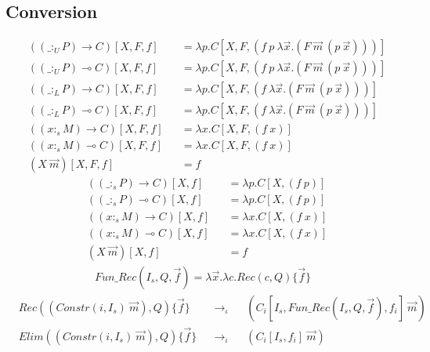 \documentclass{article}
\begin{document}
\subsection{Conversion}
\begin{align*}
  & ((\_ :_U P) \rightarrow C)[X,F,f] && = \lambda p.C[X,F,(f\ p\ \lambda \overrightarrow{x}.(F\ \overrightarrow{m}\ (p\ \overrightarrow{x})))] \\
  & ((\_ :_U P) \multimap C)[X,F,f] && = \lambda p.C[X,F,(f\ p\ \lambda \overrightarrow{x}.(F\ \overrightarrow{m}\ (p\ \overrightarrow{x})))] \\
  & ((\_ :_L P) \rightarrow C)[X,F,f] && = \lambda p.C[X,F,(f\ \lambda \overrightarrow{x}.(F\ \overrightarrow{m}\ (p\ \overrightarrow{x})))] \\
  & ((\_ :_L P) \multimap C)[X,F,f] && = \lambda p.C[X,F,(f\ \lambda \overrightarrow{x}.(F\ \overrightarrow{m}\ (p\ \overrightarrow{x})))] \\
  & ((x :_s M) \rightarrow C)[X,F,f] && = \lambda x.C[X,F,(f\ x)] \\
  & ((x :_s M) \multimap C)[X,F,f] && = \lambda x.C[X,F,(f\ x)] \\
  & (X\ \overrightarrow{m})[X,F,f] && = f
\end{align*}
\begin{align*}
  & ((\_ :_s P) \rightarrow C)[X,f] && = \lambda p.C[X,(f\ p)] \\
  & ((\_ :_s P) \multimap C)[X,f] && = \lambda p.C[X,(f\ p)] \\
  & ((x :_s M) \rightarrow C)[X,f] && = \lambda x.C[X,(f\ x)] \\
  & ((x :_s M) \multimap C)[X,f] && = \lambda x.C[X,(f\ x)] \\
  & (X\ \overrightarrow{m})[X,f] && = f
\end{align*}
\begin{align*}
  Fun\_Rec(I_s,Q,\overrightarrow{f}) = \lambda \overrightarrow{x}. \lambda c.Rec(c,Q)\{\overrightarrow{f}\}
\end{align*}
\begin{align*}
  & Rec((Constr(i, I_s)\ \overrightarrow{m}), Q)\{\overrightarrow{f}\} && \rightarrow_\iota && (C_i[I_s,Fun\_Rec(I_s,Q,\overrightarrow{f}),f_i]\ \overrightarrow{m}) \\
  & Elim((Constr(i, I_s)\ \overrightarrow{m}), Q)\{\overrightarrow{f}\} && \rightarrow_\iota && (C_i[I_s,f_i]\ \overrightarrow{m})
\end{align*}
\end{document}
